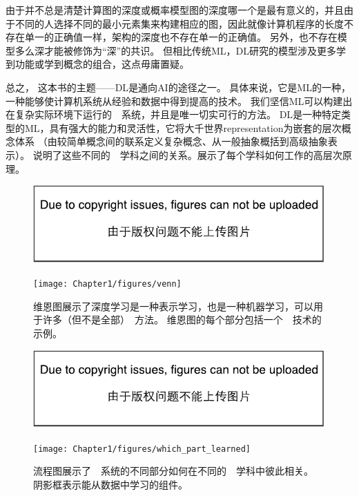 
由于并不总是清楚计算图的深度或概率模型图的深度哪一个是最有意义的，并且由于不同的人选择不同的最小元素集来构建相应的图，因此就像计算机程序的长度不存在单一的正确值一样，架构的深度也不存在单一的正确值。
另外，也不存在模型多么深才能被修饰为``深''的共识。
但相比传统\gls{ML}，\gls{DL}研究的模型涉及更多学到功能或学到概念的组合，这点毋庸置疑。

总之， 这本书的主题——\gls{DL}是通向\gls{AI}的途径之一。
具体来说，它是\gls{ML}的一种，一种能够使计算机系统从经验和数据中得到提高的技术。
我们坚信\gls{ML}可以构建出在复杂实际环境下运行的~~系统，并且是唯一切实可行的方法。
\gls{DL}是一种特定类型的\gls{ML}，具有强大的能力和灵活性，它将大千世界\gls{representation}为嵌套的层次概念体系
（由较简单概念间的联系定义复杂概念、从一般抽象概括到高级抽象表示）。
说明了这些不同的~~学科之间的关系。展示了每个学科如何工作的高层次原理。

\begin{figure}[!hbt]
\ifOpenSource
\centerline{\includegraphics{figure.pdf}}
\else
\centerline{\texttt{[image: Chapter1/figures/venn]}}
\fi
\caption{维恩图展示了深度学习是一种表示学习，也是一种机器学习，可以用于许多（但不是全部）~方法。
维恩图的每个部分包括一个~~技术的示例。
}
\label{fig:chap1_venn}
\end{figure}

\begin{figure}[!htb]
\ifOpenSource
\centerline{\includegraphics{figure.pdf}}
\else
\centerline{\texttt{[image: Chapter1/figures/which\_part\_learned]}}
\fi
\caption{流程图展示了~~系统的不同部分如何在不同的~~学科中彼此相关。
阴影框表示能从数据中学习的组件。}
\label{fig:chap1_which_part_learned}
\end{figure}


